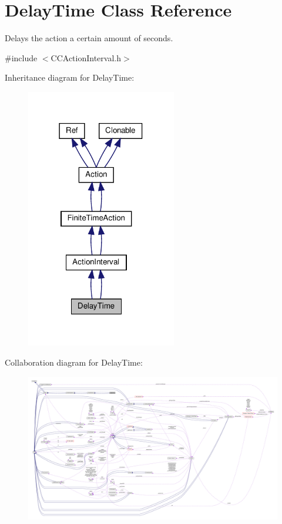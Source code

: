 \hypertarget{classDelayTime}{}\section{Delay\+Time Class Reference}
\label{classDelayTime}


Delays the action a certain amount of seconds.  




{\ttfamily \#include $<$C\+C\+Action\+Interval.\+h$>$}



Inheritance diagram for Delay\+Time\+:
\nopagebreak
\begin{figure}[H]
\begin{center}
\leavevmode
\includegraphics[width=186pt]{classDelayTime__inherit__graph}
\end{center}
\end{figure}


Collaboration diagram for Delay\+Time\+:
\nopagebreak
\begin{figure}[H]
\begin{center}
\leavevmode
\includegraphics[width=350pt]{classDelayTime__coll__graph}
\end{center}
\end{figure}
